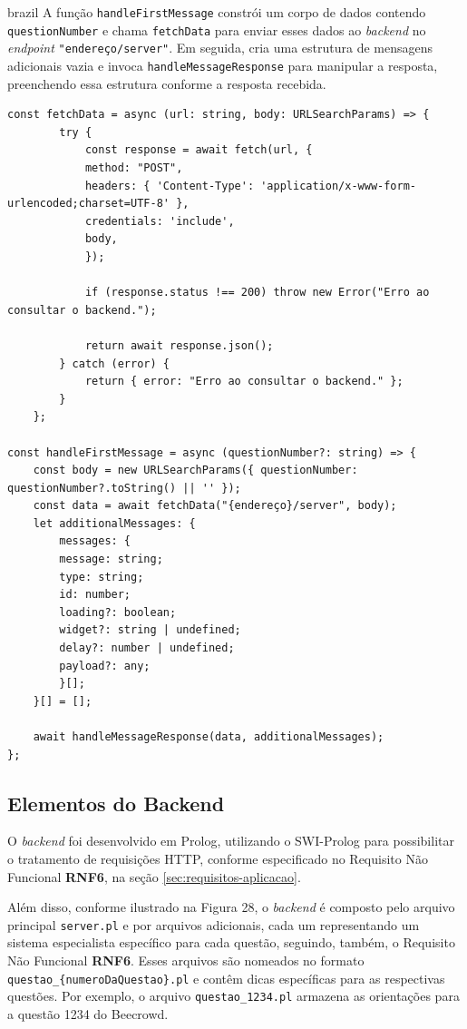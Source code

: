 \begin{otherlanguage*}{brazil}
A função \texttt{handleFirstMessage} constrói um corpo de dados contendo \texttt{questionNumber} e chama \texttt{fetchData} para enviar esses dados ao \textit{backend} no \textit{endpoint} \texttt{"{endereço}/server"}. Em seguida, cria uma estrutura de mensagens adicionais vazia e invoca \texttt{handleMessageResponse} para manipular a resposta, preenchendo essa estrutura conforme a resposta recebida.

\begin{lstlisting}[style=ufscthesisx_style, caption={Funções assíncronas para requisição HTTP}]
    const fetchData = async (url: string, body: URLSearchParams) => {
        try {
            const response = await fetch(url, {
            method: "POST",
            headers: { 'Content-Type': 'application/x-www-form-urlencoded;charset=UTF-8' },
            credentials: 'include',
            body,
            });
    
            if (response.status !== 200) throw new Error("Erro ao consultar o backend.");
    
            return await response.json();
        } catch (error) {
            return { error: "Erro ao consultar o backend." };
        }
    };

const handleFirstMessage = async (questionNumber?: string) => {
    const body = new URLSearchParams({ questionNumber: questionNumber?.toString() || '' });
    const data = await fetchData("{endereço}/server", body);
    let additionalMessages: {
        messages: {
        message: string;
        type: string;
        id: number;
        loading?: boolean;
        widget?: string | undefined;
        delay?: number | undefined;
        payload?: any;
        }[];
    }[] = [];

    await handleMessageResponse(data, additionalMessages);
};
\end{lstlisting}

\subsection{Elementos do Backend}

O \textit{backend} foi desenvolvido em Prolog, utilizando o SWI-Prolog para possibilitar o tratamento de requisições HTTP, conforme especificado no Requisito Não Funcional \textbf{RNF6}, na seção \ref{sec:requisitos-aplicacao}. 

Além disso, conforme ilustrado na Figura 28, o \textit{backend} é composto pelo arquivo principal \texttt{server.pl} e por arquivos adicionais, cada um representando um sistema especialista específico para cada questão, seguindo, também, o Requisito Não Funcional \textbf{RNF6}. Esses arquivos são nomeados no formato \texttt{questao\_\{numeroDaQuestao\}.pl} e contêm dicas específicas para as respectivas questões. Por exemplo, o arquivo \texttt{questao\_1234.pl} armazena as orientações para a questão 1234 do Beecrowd.


\end{otherlanguage*}
